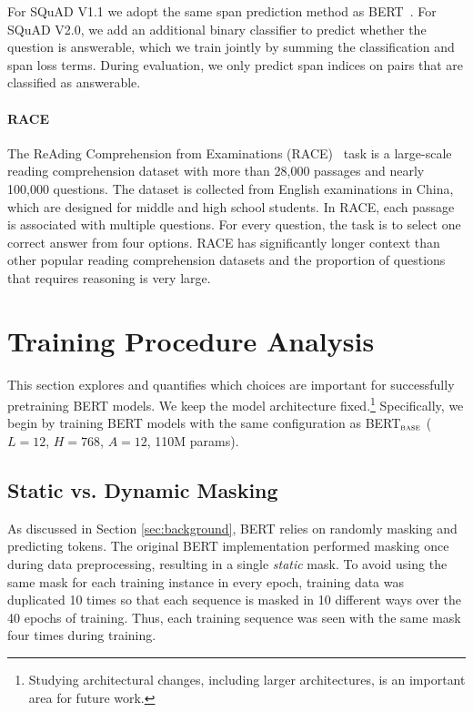 For SQuAD V1.1 we adopt the same span prediction method as BERT~\cite{devlin2018bert}. For SQuAD V2.0, we add an additional binary classifier to predict whether the question is answerable, which we train jointly by summing the classification and span loss terms. During evaluation, we only predict span indices on pairs that are classified as answerable.

\paragraph{RACE} \label{sec:race}
The ReAding Comprehension from Examinations (RACE)~\cite{lai2017large} task is a large-scale reading comprehension dataset with more than 28,000 passages and nearly 100,000 questions. The dataset is collected from English examinations in China, which are designed for middle and high school students. In RACE, each passage is associated with multiple questions. For every question, the task is to select one correct answer from four options. RACE has significantly longer context than other popular reading comprehension datasets and the proportion of questions that requires reasoning is very large.

\section{Training Procedure Analysis} \label{sec:design}

This section explores and quantifies which choices are important for successfully pretraining BERT models. We keep the model architecture fixed.\footnote{Studying architectural changes, including larger architectures, is an important area for future work.} Specifically, we begin by training BERT models with the same configuration as BERT$_{\textsc{base}}$ ($L=12$, $H=768$, $A=12$, 110M params).

\subsection{Static vs. Dynamic Masking} \label{sec:dynamic_masking}

As discussed in Section \ref{sec:background}, BERT relies on randomly masking and predicting tokens. The original BERT implementation performed masking once during data preprocessing, resulting in a single \emph{static} mask. To avoid using the same mask for each training instance in every epoch, training data was duplicated 10 times so that each sequence is masked in 10 different ways over the 40 epochs of training. Thus, each training sequence was seen with the same mask four times during training.


